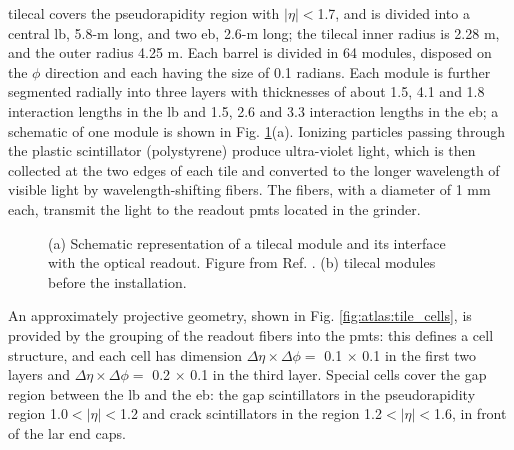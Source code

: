 \gls{tilecal} covers the pseudorapidity region with $|\eta|<$1.7, and is divided into a central \gls{lb}, 5.8-m long, and two \gls{eb}, 2.6-m long; the \gls{tilecal} inner radius is 2.28 m, and the outer radius 4.25 m. Each barrel is divided in 64 modules, disposed on the $\phi$ direction and each having the size of 0.1 radians. Each module is further segmented radially into three layers with thicknesses of about 1.5, 4.1 and 1.8 interaction lengths in the \gls{lb} and 1.5, 2.6 and 3.3 interaction lengths in the \gls{eb}; a schematic of one module is shown in Fig. \ref{fig:atlas:tile}(a). Ionizing particles passing through the plastic scintillator (polystyrene) produce ultra-violet light, which is then collected at the two edges of each tile and converted to the longer wavelength of visible light by wavelength-shifting fibers. The fibers, with a diameter of 1 mm each, transmit the light to the readout \glspl{pmt} located in the grinder.

\begin{figure}[ht]
\centering
{}
\caption{(a) Schematic representation of a \gls{tilecal} module and its interface with the optical readout. Figure from Ref. \cite{atlas:atlas}. (b) \gls{tilecal} modules before the installation.}
\label{fig:atlas:tile}
\end{figure}

An approximately projective geometry, shown in Fig. \ref{fig:atlas:tile_cells}, is provided by the grouping of the readout fibers into the \glspl{pmt}: this defines a cell structure, and each cell has dimension $\Delta\eta \times \Delta\phi = $ 0.1 $\times$ 0.1 in the first two layers and $\Delta\eta \times \Delta\phi = $ 0.2 $\times$ 0.1 in the third layer. Special cells cover the gap region between the \gls{lb} and the \gls{eb}: the gap scintillators in the pseudorapidity region 1.0$<|\eta|<$1.2 and crack scintillators in the region 1.2$<|\eta|<$1.6, in front of the \gls{lar} end caps.


